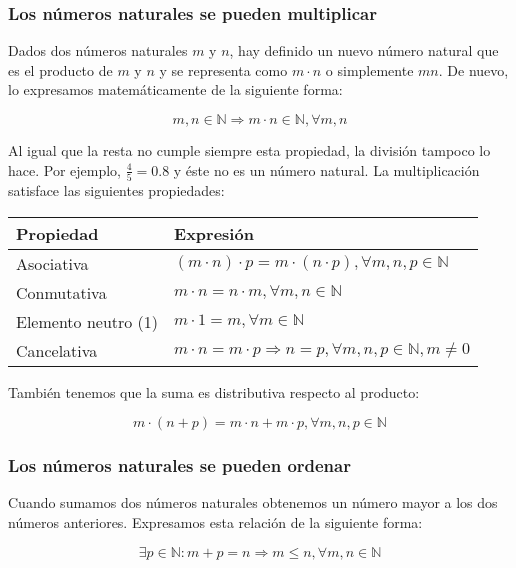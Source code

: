 \subsubsection{Los números naturales se pueden multiplicar}

Dados dos números naturales $m$ y $n$, hay definido un nuevo número natural que es el producto de $m$ y $n$ y se representa como $m \cdot n$ o simplemente $mn$.
De nuevo, lo expresamos matemáticamente de la siguiente forma:

\[m,n \in\mathbb{N} \Rightarrow m \cdot n \in\mathbb{N}, \forall m,n\]

Al igual que la resta no cumple siempre esta propiedad, la división tampoco lo hace.
Por ejemplo, $\frac{4}{5}=0.8$ y éste no es un número natural.
La multiplicación satisface las siguientes propiedades:

\begin{center}
\begin{tabular}{l l}
	\textbf{Propiedad}  & \textbf{Expresión}                                                             \\
	\toprule
	Asociativa          & $(m \cdot n) \cdot p = m \cdot (n \cdot p), \forall m,n,p \in\mathbb{N}$       \\
	Conmutativa         & $m \cdot n = n \cdot m, \forall m,n \in\mathbb{N}$                             \\
	Elemento neutro (1) & $m \cdot 1 = m, \forall m \in\mathbb{N}$                                       \\
	Cancelativa         & $m \cdot n = m \cdot p \Rightarrow n=p, \forall m,n,p \in\mathbb{N}, m \neq 0$ \\
\end{tabular}
\end{center}

También tenemos que la suma es distributiva respecto al producto:

\[m \cdot (n+p) = m \cdot n + m \cdot p, \forall m,n,p \in\mathbb{N}\]

\subsubsection{Los números naturales se pueden ordenar}

Cuando sumamos dos números naturales obtenemos un número mayor a los dos números anteriores.
Expresamos esta relación de la siguiente forma:

\[\exists p \in\mathbb{N} : m+p = n \Rightarrow m \leq n, \forall m,n \in\mathbb{N}\]

